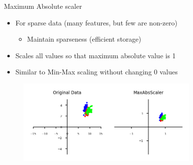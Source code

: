 \begin{frame}{Maximum Absolute scaler}
    \begin{itemize}
        \item For sparse data (many features, but few are non-zero)
        \begin{itemize}
            \item Maintain sparseness (efficient storage)
        \end{itemize}
        \item Scales all values so that maximum absolute value is 1
        \item Similar to Min-Max scaling without changing 0 values
    \end{itemize}

    \begin{figure}
        \centering
        \includegraphics[width=0.8\textwidth,keepaspectratio]{images/pre-processing/scaling_7.png}
    \end{figure}
\end{frame}
